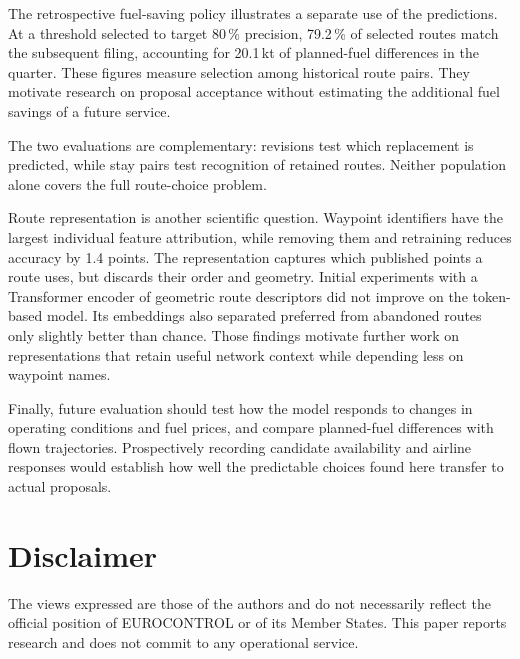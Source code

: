 \documentclass[conference,10pt,a4paper,IEEEoverridecommandlockouts]{IEEEtran}
\begin{document}
The retrospective fuel-saving policy illustrates a separate use of the
predictions. At a threshold selected to target 80\,\% precision,
79.2\,\% of selected routes match the subsequent filing, accounting for
20.1\,kt of planned-fuel differences in the quarter. These figures
measure selection among historical route pairs. They motivate research
on proposal acceptance without estimating the additional fuel savings
of a future service.

The two evaluations are complementary: revisions test which replacement
is predicted, while stay pairs test recognition of retained routes.
Neither population alone covers the full route-choice problem.

Route representation is another scientific question. Waypoint identifiers
have the largest individual feature attribution, while removing them and
retraining reduces accuracy by 1.4 points. The representation captures
which published points a route uses, but discards their order and
geometry. Initial experiments with a Transformer encoder of geometric
route descriptors did not improve on the token-based model. Its
embeddings also separated preferred from abandoned routes only slightly
better than chance. Those findings motivate further work on representations
that retain useful network context while depending less on waypoint names.

Finally, future evaluation should test how the model responds to changes
in operating conditions and fuel prices, and compare planned-fuel
differences with flown trajectories. Prospectively recording candidate
availability and airline responses would establish how well the
predictable choices found here transfer to actual proposals.

\section*{Disclaimer}
The views expressed are those of the authors and do not necessarily reflect
the official position of EUROCONTROL or of its Member States. This paper
reports research and does not commit to any operational service.

{\footnotesize


}
\end{document}
